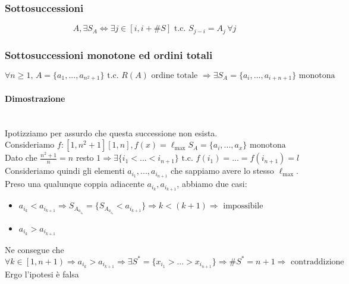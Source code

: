 \documentclass{report}
\newcommand{\subsubsubsection}[1]{\paragraph{#1}\mbox{}\\}
\begin{document}
        \subsubsection{Sottosuccessioni}
            $$A, \exists S_A \Longleftrightarrow \exists j \in \left[i, i + \#S\right] \textrm{ t.c. } S_{j-i} = A_j \, \forall j$$
        \subsubsection{Sottosuccessioni monotone ed ordini totali}
            $$\forall n \geq 1, \, A = \{a_1, ..., a_{n^2+1}\} \textrm{ t.c. } R\left(A\right) \textrm{ ordine totale } 
                \Longrightarrow \exists S_A = \{a_i, ..., a_{i+n+1}\} \textrm{ monotona }$$
            \subsubsubsection{Dimostrazione}
                Ipotizziamo per assurdo che questa successione non esista. \\
                Consideriamo $f:\left[1, n^2 + 1\right] \left[1, n \right], 
                    f\left(x\right) = \ell_{\textrm{max}} S_A = \{a_i, ..., a_x\} \textrm{ monotona }$ \\
                Dato che $\frac{n^2+1}{n} = n$ resto $1 \Longrightarrow \exists \{i_1 < ... < i_{n+1}\} 
                    \textrm{ t.c. } f\left(i_1\right) = ... = f\left(i_{n+1}\right) = l$ \\
                Consideriamo quindi gli elementi $a_{i_1}, ..., a_{i_{n+1}}$ che sappiamo avere lo stesso $\ell_{\textrm{max}}$. \\
                Preso una qualunque coppia adiacente $a_{i_k}, a_{i_{k+1}}$, abbiamo due casi:
                \begin{itemize}
                    \item $a_{i_k} < a_{i_{k+1}} \Longrightarrow S_{A_{a_{i_k}}} = 
                        \{S_{A_{a_{i_k}}} < a_{i_{k+1}}\} \Longrightarrow k < \left(k + 1\right) \Longrightarrow \textrm{ impossibile }$
                    \item $a_{i_k} > a_{i_{k+1}}$
                \end{itemize}
                Ne consegue che 
                $$\forall k \in \left[1, n+1\right) \Longrightarrow a_{i_k} > a_{i_{k+1}} 
                    \Longrightarrow \exists S^* = \{x_{i_1} > ... > x_{i_{n+1}}\} \Longrightarrow \#S^* = n+1 \Longrightarrow \textrm{ contraddizione }$$
                Ergo l'ipotesi è falsa 
\newpage 
\end{document}
